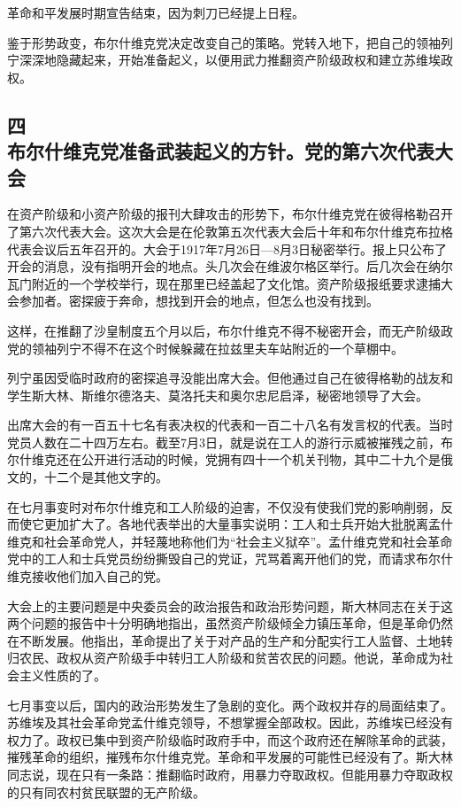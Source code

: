 革命和平发展时期宣告结束，因为刺刀已经提上日程。

鉴于形势政变，布尔什维克党决定改变自己的策略。党转入地下，把自己的领袖列宁深深地隐藏起来，开始准备起义，以便用武力推翻资产阶级政权和建立苏维埃政权。


\subsection[四\q 布尔什维克党准备武装起义的方针。党的第六次代表大会]{四\\布尔什维克党准备武装起义的方针。党的第六次代表大会}

在资产阶级和小资产阶级的报刊大肆攻击的形势下，布尔什维克党在彼得格勒召开了第六次代表大会。这次大会是在伦敦第五次代表大会后十年和布尔什维克布拉格代表会议后五年召开的。大会于1917年7月26日—8月3日秘密举行。报上只公布了开会的消息，没有指明开会的地点。头几次会在维波尔格区举行。后几次会在纳尔瓦门附近的一个学校举行，现在那里已经盖起了文化馆。资产阶级报纸要求逮捕大会参加者。密探疲于奔命，想找到开会的地点，但怎么也没有找到。

这样，在推翻了沙皇制度五个月以后，布尔什维克不得不秘密开会，而无产阶级政党的领袖列宁不得不在这个时候躲藏在拉兹里夫车站附近的一个草棚中。

列宁虽因受临时政府的密探追寻没能出席大会。但他通过自己在彼得格勒的战友和学生斯大林、斯维尔德洛夫、莫洛托夫和奥尔忠尼启泽，秘密地领导了大会。

出席大会的有一百五十七名有表决权的代表和一百二十八名有发言权的代表。当时党员人数在二十四万左右。截至7月3日，就是说在工人的游行示威被摧残之前，布尔什维克还在公开进行活动的时候，党拥有四十一个机关刊物，其中二十九个是俄文的，十二个是其他文字的。

在七月事变时对布尔什维克和工人阶级的迫害，不仅没有使我们党的影响削弱，反而使它更加扩大了。各地代表举出的大量事实说明：工人和士兵开始大批脱离孟什维克和社会革命党人，并轻蔑地称他们为“社会主义狱卒”。孟什维克党和社会革命党中的工人和士兵党员纷纷撕毁自己的党证，咒骂着离开他们的党，而请求布尔什维克接收他们加入自己的党。

大会上的主要问题是中央委员会的政治报告和政治形势问题，斯大林同志在关于这两个问题的报告中十分明确地指出，虽然资产阶级倾全力镇压革命，但是革命仍然在不断发展。他指出，革命提出了关于对产品的生产和分配实行工人监督、土地转归农民、政权从资产阶级手中转归工人阶级和贫苦农民的问题。他说，革命成为社会主义性质的了。

七月事变以后，国内的政治形势发生了急剧的变化。两个政权并存的局面结束了。苏维埃及其社会革命党孟什维克领导，不想掌握全部政权。因此，苏维埃已经没有权力了。政权已集中到资产阶级临时政府手中，而这个政府还在解除革命的武装，摧残革命的组织，摧残布尔什维克党。革命和平发展的可能性已经没有了。斯大林同志说，现在只有一条路：推翻临时政府，用暴力夺取政权。但能用暴力夺取政权的只有同农村贫民联盟的无产阶级。

